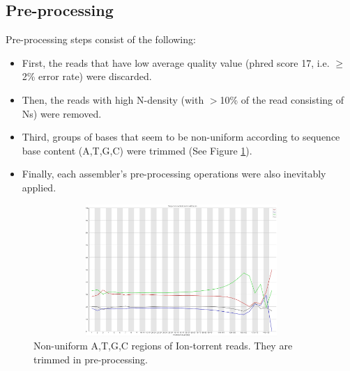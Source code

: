 \documentclass{llncs}
\begin{document}
\subsection{Pre-processing} 
Pre-processing steps consist of the following: 
\begin{itemize}
\item First, the reads that have low average quality value (phred score 17, i.e. $\geq$2\% error rate) were discarded. 
\item Then, the reads with high N-density (with $>$10\% of the read consisting of Ns) were removed. 
\item Third, groups of bases that seem to be non-uniform according to sequence base content (A,T,G,C) were trimmed (See Figure \ref{nonuniformATGC}). 
\item Finally, each assembler's pre-processing operations were also inevitably applied.
\end{itemize}

\begin{figure}[htbp]
\centerline{\includegraphics[width=12cm, height=5cm]{ionTorrentFastqc.jpg}}
\caption{Non-uniform A,T,G,C regions of Ion-torrent reads. They are trimmed in pre-processing.}
\label{nonuniformATGC}
\end{figure}
\end{document}
